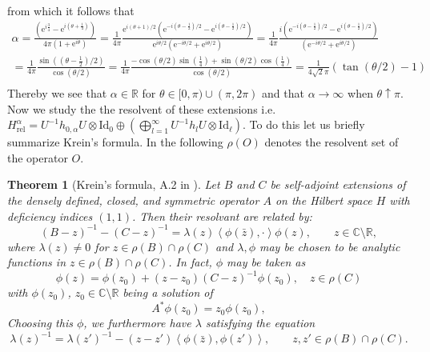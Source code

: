 \documentclass[a4paper,11pt]{article}
\newcommand{\euler}[1]{\text{e}^{#1}}
\renewcommand{\braket}[1]{\left\langle#1\right\rangle}
\newcommand{\R}{\mathbb{R}}
\newcommand{\C}{\mathbb{C}}
\newtheorem{theorem}{Theorem}
\numberwithin{equation}{section}
\begin{document}
from which it follows that \begin{equation}
\begin{aligned}
\alpha=\frac{(\euler{i\frac{3}{4}}-\euler{i(\theta+\frac{1}{4})})}{4\pi(1+\euler{i\theta})}=\frac{1}{4\pi}\frac{\euler{i(\theta+1)/2}(\euler{-i(\theta-\frac{1}{2})/2}-\euler{i(\theta-\frac{1}{2})/2})}{\euler{i\theta/2}(\euler{-i\theta/2}+\euler{i\theta/2})}=\frac{1}{4\pi}\frac{i(\euler{-i(\theta-\frac{1}{2})/2}-\euler{i(\theta-\frac{1}{2})/2})}{(\euler{-i\theta/2}+\euler{i\theta/2})}\\=\frac{1}{4\pi}\frac{\sin((\theta-\frac{1}{2})/2)}{\cos(\theta/2)}=\frac{1}{4\pi}\frac{-\cos(\theta/2)\sin(\frac{1}{4})+\sin(\theta/2)\cos(\frac{1}{4})}{\cos(\theta/2)}=\frac{1}{4\sqrt{2}\pi}\left(\tan(\theta/2)-1\right)\\
\end{aligned}
\end{equation}
Thereby we see that $ \alpha\in \R $ for $ \theta\in[0,\pi)\cup(\pi,2\pi) $ and that $ \alpha\to\infty $ when $ \theta\uparrow\pi $. Now we study the the resolvent of these extensions i.e. $ H_{\text{rel}}^{\alpha}=U^{-1}h_{0,\alpha}U\otimes\text{Id}_{0}\oplus\left(\bigoplus_{l=1}^{\infty}U^{-1}h_lU\otimes\text{Id}_{\ell} \right) $. To do this let us briefly summarize Krein's formula. In the following $ \rho(O) $ denotes the resolvent set of the operator $ O $.
\begin{theorem}[Krein's formula, A.2 in \cite{albeverio2012solvable}]
	\label{Krein's formula}
	Let $ B $ and $ C $ be self-adjoint extensions of the densely defined, closed, and symmetric operator $ A $ on the Hilbert space $ H $ with deficiency indices $ (1,1) $. Then their resolvant are related by:\begin{equation}
	(B-z)^{-1}-(C-z)^{-1}=\lambda(z)\braket{\phi(\bar{z}),\cdot}\phi(z),\qquad z\in\C\setminus\R,
	\end{equation}
	where $ \lambda(z)\neq0 $ for $ z\in\rho(B)\cap\rho(C) $ and $\lambda, \phi $ may be  chosen to be analytic functions in $ z\in\rho(B)\cap\rho(C) $. In fact, $ \phi $ may be taken as \begin{equation}
	\label{phi relation}
	\phi(z)=\phi(z_0)+(z-z_0)(C-z)^{-1}\phi(z_0),\quad z\in \rho(C)
	\end{equation}
	with $ \phi(z_0) $, $ z_0\in \C\setminus\R $ being a solution of \begin{equation}
	A^*\phi(z_0)=z_0\phi(z_0),
	\end{equation}
	Choosing this $ \phi $, we furthermore have $ \lambda $ satisfying the equation\begin{equation}
	\label{lambda relation}
	\lambda(z)^{-1}=\lambda(z')^{-1}-(z-z')\braket{\phi(\bar{z}),\phi(z')},\qquad z,z'\in\rho(B)\cap\rho(C).
	\end{equation}
\end{theorem}
\end{document}
